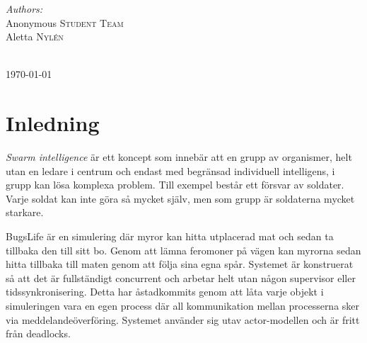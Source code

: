 \documentclass[12pt]{article}
\begin{document}
\begin{titlepage}

\begin{minipage}{0.6\textwidth}
\begin{flushleft} \large
\emph{Authors:}\\
Anonymous \textsc{Student Team}\\ %
Aletta \textsc{Nylén}\\ %
\end{flushleft}

\end{minipage}\\[2cm]



{\large \today}\\[2cm] %

\vfill %





\end{titlepage}
\section{Inledning}
\textit{Swarm intelligence} är ett koncept som innebär att en grupp av organismer,
helt utan en ledare i centrum och endast med begränsad individuell intelligens, 
i grupp kan lösa komplexa problem.
Till exempel består ett försvar av soldater.
Varje soldat kan inte göra så mycket själv, men som grupp är soldaterna mycket starkare.

BugsLife är en simulering där myror kan hitta utplacerad mat och sedan ta tillbaka den till sitt bo.
Genom att lämna feromoner på vägen kan myrorna sedan hitta tillbaka till maten genom att följa sina egna spår.
Systemet är konstruerat så att det är fullständigt concurrent och arbetar helt utan någon supervisor eller tidssynkronisering.
Detta har åstadkommits genom att låta varje objekt i simuleringen vara en egen process där all kommunikation mellan processerna sker via meddelandeöverföring.
Systemet använder sig utav actor-modellen och är fritt från deadlocks.
\end{document}
